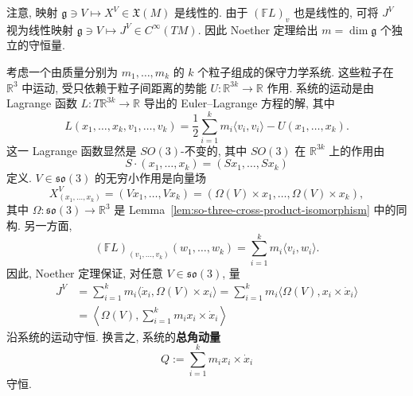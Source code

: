 \begin{RiemannRemark}\label{rem:noether-conserved-quantities-and-lie-algebra}
注意, 映射 $\mathfrak{g}\ni V\mapsto X^V\in\mathfrak{X}(M)$ 是线性的. 由于 $(\mathbb{F}L)_v$ 也是线性的, 可将 $J^V$ 视为线性映射 $\mathfrak{g}\ni V\mapsto J^V\in C^\infty(TM)$. 因此 Noether 定理给出 $m=\dim\mathfrak{g}$ 个独立的守恒量.
\end{RiemannRemark}

\begin{RiemannExample}\label{ex:noether-total-angular-momentum}
考虑一个由质量分别为 $m_1,\ldots,m_k$ 的 $k$ 个粒子组成的保守力学系统. 这些粒子在 $\mathbb{R}^3$ 中运动, 受只依赖于粒子间距离的势能 $U:\mathbb{R}^{3k}\to\mathbb{R}$ 作用. 系统的运动是由 Lagrange 函数 $L:T\mathbb{R}^{3k}\to\mathbb{R}$ 导出的 Euler–Lagrange 方程的解, 其中
\[
  L(x_1,\ldots,x_k,v_1,\ldots,v_k)
  =\frac{1}{2}\sum_{i=1}^k m_i\langle v_i,v_i\rangle-U(x_1,\ldots,x_k).
\]
这一 Lagrange 函数显然是 $SO(3)$-不变的, 其中 $SO(3)$ 在 $\mathbb{R}^{3k}$ 上的作用由
\[
  S\cdot(x_1,\ldots,x_k)=(Sx_1,\ldots,Sx_k)
\]
定义. $V\in\mathfrak{so}(3)$ 的无穷小作用是向量场
\[
  X^V_{(x_1,\ldots,x_k)}=(Vx_1,\ldots,Vx_k)
  =(\Omega(V)\times x_1,\ldots,\Omega(V)\times x_k),
\]
其中 $\Omega:\mathfrak{so}(3)\to\mathbb{R}^3$ 是 Lemma~\ref{lem:so-three-cross-product-isomorphism} 中的同构. 另一方面,
\[
  (\mathbb{F}L)_{(v_1,\ldots,v_k)}(w_1,\ldots,w_k)=\sum_{i=1}^k m_i\langle v_i,w_i\rangle.
\]
因此, Noether 定理保证, 对任意 $V\in\mathfrak{so}(3)$, 量
\begin{align*}
  J^V&=\sum_{i=1}^k m_i\langle\dot x_i,\Omega(V)\times x_i\rangle
  =\sum_{i=1}^k m_i\langle\Omega(V),x_i\times\dot x_i\rangle\\
  &=\left\langle\Omega(V),\sum_{i=1}^km_ix_i\times\dot x_i\right\rangle
\end{align*}
沿系统的运动守恒. 换言之, 系统的\label{idx:noether-conserved-total-angular-momentum}\textbf{总角动量}
\[
  Q:=\sum_{i=1}^k m_ix_i\times\dot x_i
\]
守恒.
\end{RiemannExample}

